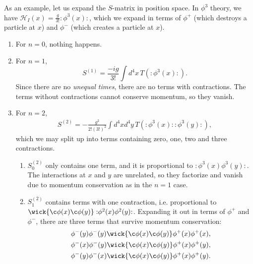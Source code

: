 \documentclass{article}
\newcommand{\normord}[1]{:\mathrel{#1}:}
\begin{document}
As an example, let us expand the $S$-matrix in position space. In $\phi^3$ theory, we have $\mathcal{H}_I(x) = \frac{g}{3!}\normord{\phi^3(x)}$, which we expand in terms of $\phi^+$ (which destroys a particle at $x$) and $\phi^-$ (which creates a particle at $x$).

\begin{enumerate}
    \item For $n=0$, nothing happens.
    \item For $n=1$,
    \begin{equation}
        S^{(1)} =\frac{-ig}{3!} \int d^4x \, T(\normord{\phi^3(x)}).
    \end{equation}
        Since there are no \textit{unequal times}, there are no terms with contractions. The terms without contractions cannot conserve momentum, so they vanish.
    \item For $n=2$,
    \begin{equation}
        \begin{aligned}
            S^{(2)} = -\frac{g^2}{2!(3!)^2} \int d^4x d^4y \, T\left(\normord{\phi^3(x)}\normord{\phi^3(y)}\right),
        \end{aligned}
    \end{equation}
        which we may split up into terms containing zero, one, two and three contractions.
    \begin{enumerate}
        \item $S_0^{(2)}$ only contains one term, and it is proportional to $\normord{\phi^3(x)\phi^3(y)}$. The interactions at $x$ and $y$ are unrelated, so they factorize and vanish due to momentum conservation as in the $n=1$ case.
        \item $S_1^{(2)}$ contains terms with one contraction, i.e. proportional to $\wick{\c\phi(x) \c\phi(y)} \normord{\phi^2(x) \phi^2(y)}$. Expanding it out in terms of $\phi^+$ and $\phi^-$, there are three terms that survive momentum conservation:
        \begin{equation} \label{eq:s12}
            \begin{aligned}
                \phi^-(y)\phi^-(y)\wick{\c\phi(x) \c\phi(y)}\phi^+(x)\phi^+(x), \\
                \phi^-(x)\phi^-(y)\wick{\c\phi(x) \c\phi(y)}\phi^+(x)\phi^+(y), \\
                \phi^-(y)\phi^-(x)\wick{\c\phi(x) \c\phi(y)}\phi^+(x)\phi^+(y).
            \end{aligned}
        \end{equation}

\end{enumerate}
\end{enumerate}
\end{document}
